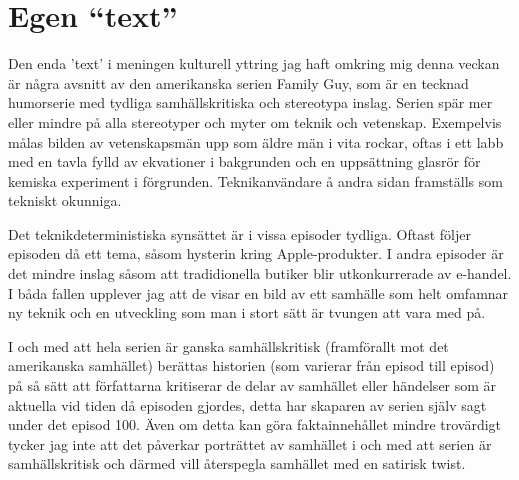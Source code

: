 \documentclass[12pt,a4paper]{IEEEtran}
\begin{document}
\section*{Egen ``text''}
Den enda 'text' i meningen kulturell yttring jag haft omkring mig denna veckan är några avsnitt av den amerikanska serien Family Guy, som är en tecknad humorserie med tydliga samhällskritiska och stereotypa inslag. Serien spär mer eller mindre på alla stereotyper och myter om teknik och vetenskap.
Exempelvis målas bilden av vetenskapsmän upp som äldre män i vita rockar, oftas i ett labb med en tavla fylld av ekvationer i bakgrunden och en uppsättning glasrör för kemiska experiment i förgrunden. Teknikanvändare å andra sidan framställs som tekniskt okunniga.

Det teknikdeterministiska synsättet är i vissa episoder tydliga. Oftast följer episoden då ett tema, såsom hysterin kring Apple-produkter. I andra episoder är det mindre inslag såsom att tradidionella butiker blir utkonkurrerade av e-handel. I båda fallen upplever jag att de visar en bild av ett samhälle som helt omfamnar ny teknik och en utveckling som man i stort sätt är tvungen att vara med på.

I och med att hela serien är ganska samhällskritisk (framförallt mot det amerikanska samhället) berättas historien (som varierar från episod till episod) på så sätt att författarna kritiserar de delar av samhället eller händelser som är aktuella vid tiden då episoden gjordes, detta har skaparen av serien själv sagt under det episod 100. Även om detta kan göra faktainnehållet mindre trovärdigt tycker jag inte att det påverkar porträttet av samhället i och med att serien är samhällskritisk och därmed vill återspegla samhället med en satirisk twist.
\end{document}
